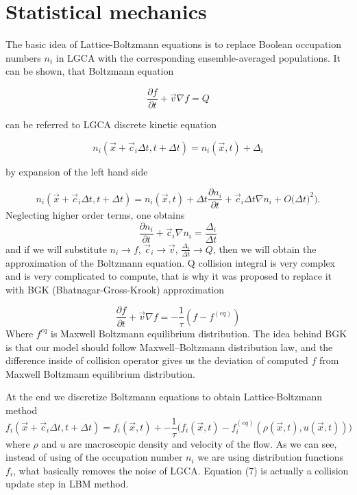 
\section{Statistical mechanics}

The basic idea of Lattice-Boltzmann equations is to replace Boolean occupation numbers $n_i$ in LGCA with the corresponding ensemble-averaged populations. It can be shown, that Boltzmann equation

\begin{equation}
\frac{\partial f}{\partial t} + \vec{v} \nabla f = Q
\end{equation}

can be referred to LGCA discrete kinetic equation

\begin{equation}
n_i(\vec{x} + \vec{c}_i \Delta t, t + \Delta t) = n_i(\vec{x},t) +\Delta_i
\end{equation}

by expansion of the left hand side

\begin{equation}
n_i(\vec{x} + \vec{c}_i \Delta t, t + \Delta t) = n_i(\vec{x},t) + \Delta t \frac{\partial n_i}{\partial t} + \vec{c}_i \Delta{t} \nabla{n_i} + O\big(\Delta t)^2\big).
\end{equation}
Neglecting higher order terms, one obtains
\begin{equation}
\frac{\partial n_i}{\partial t} + \vec{c}_i \nabla{n_i} = \frac{\Delta_i}{\Delta t}
\end{equation}
and if we will substitute $n_i \rightarrow f$, $\vec{c}_i \rightarrow \vec{v}$, $\frac{\Delta_i}{\Delta t} \rightarrow Q$, then we will obtain the approximation of the Boltzmann equation. Q collision integral is very complex and is very complicated to compute, that is why it was proposed to replace it with BGK (Bhatnagar-Gross-Krook) approximation

\begin{equation}
\frac{\partial f}{\partial t} + \vec{v} \nabla f = -\frac{1}{\tau}(f - f^{(eq)})
\end{equation}
Where $f^{eq}$ is Maxwell Boltzmann equilibrium distribution. The idea behind BGK is that our model should follow Maxwell–Boltzmann distribution law, and the difference inside of collision operator gives us the deviation of computed $f$ from  Maxwell Boltzmann equilibrium distribution.

At the end we discretize Boltzmann equations to obtain Lattice-Boltzmann method
\begin{equation}
f_i(\vec{x} + \vec{c}_i \Delta t, t + \Delta t) = f_i(\vec{x},t) + -\frac{1}{\tau} \big(f_i(\vec{x},t) - f_i^{(eq)}(\rho(\vec{x},t), u(\vec{x},t))\big)
\end{equation}
where $\rho$ and $u$ are macroscopic density and velocity of the flow. As we can see, instead of using of the occupation number $n_i$ we are using distribution functions $f_i$, what basically removes the noise of LGCA. Equation (7) is actually a collision update step in LBM method.

